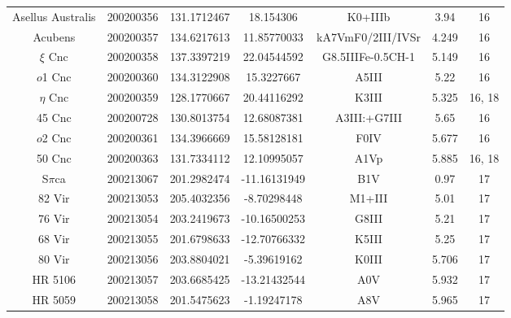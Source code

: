 \begin{table*}
\begin{tabular}{ccccccc}
Asellus Australis & 200200356 & 131.1712467 & 18.154306 & K0+IIIb & 3.94 & 16 \\
Acubens & 200200357 & 134.6217613 & 11.85770033 & kA7VmF0/2III/IVSr & 4.249 & 16 \\
$\xi$ Cnc & 200200358 & 137.3397219 & 22.04544592 & G8.5IIIFe-0.5CH-1 & 5.149 & 16 \\
$o$1 Cnc & 200200360 & 134.3122908 & 15.3227667 & A5III & 5.22 & 16 \\
$\eta$ Cnc & 200200359 & 128.1770667 & 20.44116292 & K3III & 5.325 & 16, 18 \\
45 Cnc & 200200728 & 130.8013754 & 12.68087381 & A3III:+G7III & 5.65 & 16 \\
$o$2 Cnc & 200200361 & 134.3966669 & 15.58128181 & F0IV & 5.677 & 16 \\
50 Cnc & 200200363 & 131.7334112 & 12.10995057 & A1Vp & 5.885 & 16, 18 \\
S$\pi$ca & 200213067 & 201.2982474 & -11.16131949 & B1V & 0.97 & 17 \\
82 Vir & 200213053 & 205.4032356 & -8.70298448 & M1+III & 5.01 & 17 \\
76 Vir & 200213054 & 203.2419673 & -10.16500253 & G8III & 5.21 & 17 \\
68 Vir & 200213055 & 201.6798633 & -12.70766332 & K5III & 5.25 & 17 \\
80 Vir & 200213056 & 203.8804021 & -5.39619162 & K0III & 5.706 & 17 \\
HR 5106 & 200213057 & 203.6685425 & -13.21432544 & A0V & 5.932 & 17 \\
HR 5059 & 200213058 & 201.5475623 & -1.19247178 & A8V & 5.965 & 17 \\
\hline
\end{tabular}
\end{table*}
